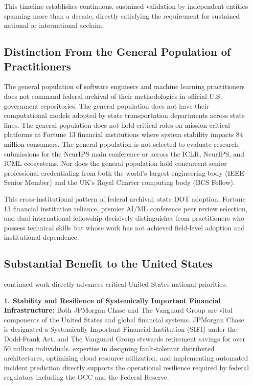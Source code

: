 This timeline establishes continuous, sustained validation by independent entities spanning more than a decade, directly satisfying the requirement for sustained national or international acclaim.

\subsection{Distinction From the General Population of Practitioners}
\label{finalmerits:distinction}

The general population of software engineers and machine learning practitioners does not command federal archival of their methodologies in official U.S. government repositories. The general population does not have their computational models adopted by state transportation departments across state lines. The general population does not hold critical roles on mission-critical platforms at Fortune 13 financial institutions where system stability impacts 84 million consumers. The general population is not selected to evaluate research submissions for the NeurIPS main conference or across the ICLR, NeurIPS, and ICML ecosystems. Nor does the general population hold concurrent senior professional credentialing from both the world's largest engineering body (IEEE Senior Member) and the UK's Royal Charter computing body (BCS Fellow).

This cross-institutional pattern of federal archival, state DOT adoption, Fortune 13 financial institution reliance, premier AI/ML conference peer review selection, and dual international fellowship decisively distinguishes \dr from practitioners who possess technical skills but whose work has not achieved field-level adoption and institutional dependence.

\subsection{Substantial Benefit to the United States}
\label{finalmerits:benefit}

\drs continued work directly advances critical United States national priorities:

\textbf{1. Stability and Resilience of Systemically Important Financial Infrastructure:} Both JPMorgan Chase and The Vanguard Group are vital components of the United States and global financial systems. JPMorgan Chase is designated a Systemically Important Financial Institution (SIFI) under the Dodd-Frank Act, and The Vanguard Group stewards retirement savings for over 50 million individuals. \drs expertise in designing fault-tolerant distributed architectures, optimizing cloud resource utilization, and implementing automated incident prediction directly supports the operational resilience required by federal regulators including the OCC and the Federal Reserve.

